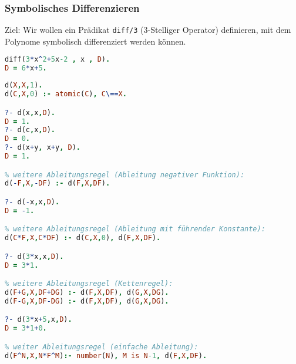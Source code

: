\subsubsection{Symbolisches Differenzieren}
Ziel: Wir wollen ein Prädikat \lstinline$diff/3$ (3-Stelliger Operator) definieren, mit dem Polynome symbolisch differenziert werden können.
 $ $
\begin{lstlisting}[language=Prolog]
diff(3*x^2+5x-2 , x , D).
D = 6*x+5.
\end{lstlisting}
\begin{lstlisting}[language=Prolog]
d(X,X,1).
d(C,X,0) :- atomic(C), C\==X.

?- d(x,x,D).
D = 1.
?- d(c,x,D).
D = 0.
?- d(x+y, x+y, D).
D = 1.

% weitere Ableitungsregel (Ableitung negativer Funktion):
d(-F,X,-DF) :- d(F,X,DF).

?- d(-x,x,D).
D = -1.

% weitere Ableitungsregel (Ableitung mit führender Konstante):
d(C*F,X,C*DF) :- d(C,X,0), d(F,X,DF).

?- d(3*x,x,D).
D = 3*1.

% weitere Ableitungsregel (Kettenregel):
d(F+G,X,DF+DG) :- d(F,X,DF), d(G,X,DG).
d(F-G,X,DF-DG) :- d(F,X,DF), d(G,X,DG).

?- d(3*x+5,x,D).
D = 3*1+0.

% weiter Ableitungsregel (einfache Ableitung): 
d(F^N,X,N*F^M):- number(N), M is N-1, d(F,X,DF).
\end{lstlisting}

